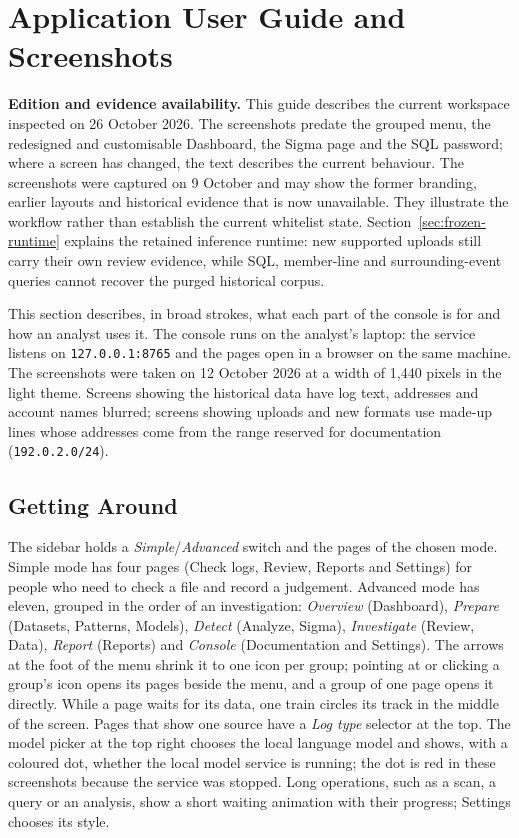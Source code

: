 \documentclass[11pt,a4paper]{article}
\begin{document}
\clearpage
\section{Application User Guide and Screenshots}
\label{app:user-guide}

\label{sec:guide}

\textbf{Edition and evidence availability.} This guide describes the current workspace inspected on 26 October 2026. The screenshots predate the grouped menu, the redesigned and customisable Dashboard, the Sigma page and the SQL password; where a screen has changed, the text describes the current behaviour. The screenshots were captured on 9 October and may show the former branding, earlier layouts and historical evidence that is now unavailable. They illustrate the workflow rather than establish the current whitelist state. Section~\ref{sec:frozen-runtime} explains the retained inference runtime: new supported uploads still carry their own review evidence, while SQL, member-line and surrounding-event queries cannot recover the purged historical corpus.

This section describes, in broad strokes, what each part of the console is for and how an analyst uses it. The console runs on the analyst's laptop: the service listens on \nolinkurl{127.0.0.1:8765} and the pages open in a browser on the same machine. The screenshots were taken on 12 October 2026 at a width of 1,440 pixels in the light theme. Screens showing the historical data have log text, addresses and account names blurred; screens showing uploads and new formats use made-up lines whose addresses come from the range reserved for documentation (\nolinkurl{192.0.2.0/24}).

\subsection{Getting Around}

The sidebar holds a \emph{Simple}/\emph{Advanced} switch and the pages of the chosen mode. Simple mode has four pages (Check logs, Review, Reports and Settings) for people who need to check a file and record a judgement. Advanced mode has eleven, grouped in the order of an investigation: \emph{Overview} (Dashboard), \emph{Prepare} (Datasets, Patterns, Models), \emph{Detect} (Analyze, Sigma), \emph{Investigate} (Review, Data), \emph{Report} (Reports) and \emph{Console} (Documentation and Settings). The arrows at the foot of the menu shrink it to one icon per group; pointing at or clicking a group's icon opens its pages beside the menu, and a group of one page opens it directly. While a page waits for its data, one train circles its track in the middle of the screen. Pages that show one source have a \emph{Log type} selector at the top. The model picker at the top right chooses the local language model and shows, with a coloured dot, whether the local model service is running; the dot is red in these screenshots because the service was stopped. Long operations, such as a scan, a query or an analysis, show a short waiting animation with their progress; Settings chooses its style.
\end{document}

